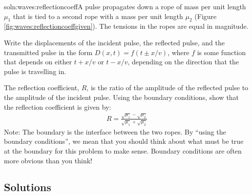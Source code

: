 \begin{problemParts}{soln:waves:reflectioncoeff}{\label{prob:waves:reflectioncoeff}A pulse propagates down a rope of mass per unit length $\mu_1$ that is tied to a second rope with a mass per unit length $\mu_2$ (Figure \ref{fig:waves:reflectioncoeffgiven}). The tensions in the ropes are equal in magnitude.
}
\item Write the displacements of the incident pulse, the reflected pulse, and the transmitted pulse in the form $D(x,t)=f(t\pm x/v)$, where $f$ is some function that depends on either $t+x/v$ or $t-x/v$, depending on the direction that the pulse is travelling in.
\item The reflection coefficient, $R$, is the ratio of the amplitude of the reflected pulse to the amplitude of the incident pulse. Using the boundary conditions, show that the reflection coefficient is given by:
\begin{align*}
R=\frac{\sqrt{\mu_1}-\sqrt{\mu_2}}{\sqrt{\mu_1}+\sqrt{\mu_2}}
\end{align*}
Note: The boundary is the interface between the two ropes. By ``using the boundary conditions'', we mean that you should think about what must be true at the boundary for this problem to make sense. Boundary conditions are often more obvious than you think!
\end{problemParts}

\newpage
\subsection{Solutions}

